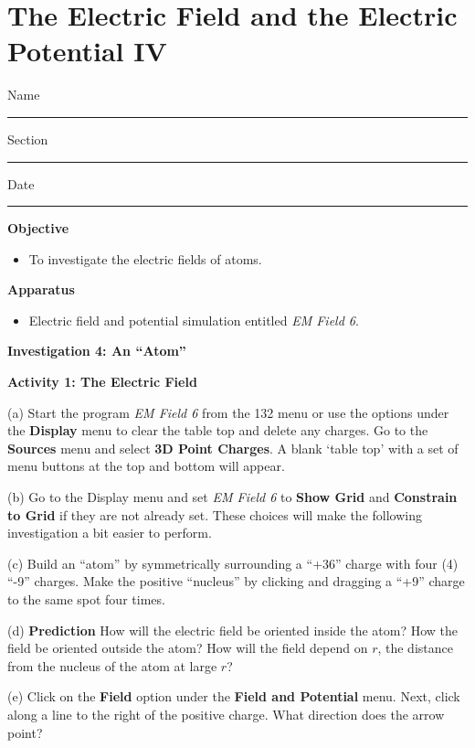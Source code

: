 
\section{The Electric Field and the Electric Potential IV}

Name \rule{2.0in}{0.1pt}\hfill{}Section \rule{1.0in}{0.1pt}\hfill{}Date
\rule{1.0in}{0.1pt}

\textbf{Objective}

\begin{itemize}
\item To investigate the electric fields of atoms.
\end{itemize}

\textbf{Apparatus}

\begin{itemize}
\item Electric field and potential simulation entitled {\it EM Field 6}.
\end{itemize}

\textbf{Investigation 4: An {}``Atom''}

\textbf{Activity 1: The Electric Field}

(a) Start the program {\it EM Field 6} from the 132 menu or use the options under the 
\textbf{Display} menu to clear the table top and delete any charges.
Go to the \textbf{Sources} menu and select \textbf{3D Point Charges}.
A blank `table top' with a set of menu 
buttons at the top and bottom will appear.

(b) Go to the Display menu and set {\it EM Field 6} to
{\bf Show Grid} and {\bf Constrain to Grid} if they are not already set.
These choices will make the following investigation a bit easier to perform.

(c) Build an {}``atom'' by symmetrically surrounding
a {}``+36'' charge with four (4) {}``-9'' charges.
Make the positive ``nucleus'' by clicking and dragging a ``+9'' charge
to the same spot four times.


(d) {\bf Prediction} How will the electric field be oriented inside the atom?
How the field be oriented outside the atom?
How will the field depend on $r$, the distance from the nucleus of the atom
at large $r$?
\vspace{25mm}

(e) Click on the \textbf{Field} option under the \textbf{Field and Potential} menu.
Next, click along a line to the right of the positive charge.
What direction does the arrow point?
\vspace{15mm}

